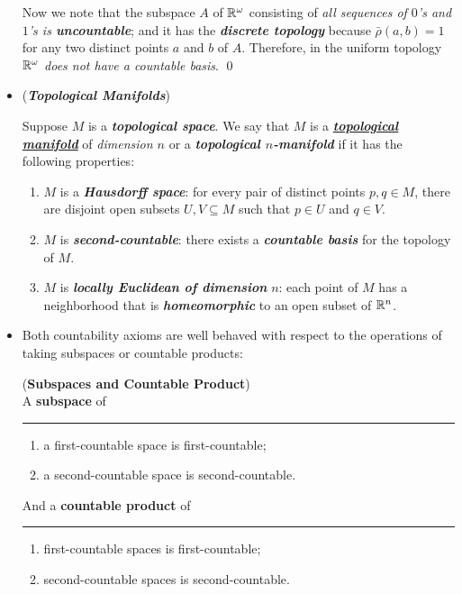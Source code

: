 \documentclass[11pt]{article}
\begin{document}
\begin{itemize}
\begin{example}
Now we note that the subspace $A$ of ${\mathbb R}^{\omega}$ consisting of \emph{all sequences of $0$'s and $1$'s is \textbf{uncountable}}; and it has the \emph{\textbf{discrete topology}} because $\bar{\rho}(a, b) = 1$ for any two distinct points $a$ and $b$ of $A$. Therefore, in the uniform topology ${\mathbb R}^{\omega}$ \emph{does not have a countable basis}. \qed
\end{example}

\item \begin{example} (\emph{\textbf{Topological Manifolds}})
 \begin{definition}
Suppose $M$ is a \emph{\textbf{topological space}}. We say that $M$ is a \underline{\emph{\textbf{topological manifold}}} of \emph{dimension $n$} or a \emph{\textbf{topological $n$-manifold}} if it has the following properties:
\begin{enumerate}
\item $M$ is a \emph{\textbf{Hausdorff space}}: for every pair of distinct points $p, q \in M$, there are disjoint open subsets $U, V \subseteq M$ such that $p \in U$ and $q \in V$.
\item $M$ is \emph{\textbf{second-countable}}: there exists a \emph{\textbf{countable basis}} for the topology of $M$.
\item $M$ is \emph{\textbf{locally Euclidean of dimension}} $n$: each point of $M$ has a neighborhood that is \emph{\textbf{homeomorphic}} to an open subset of ${\mathbb R}^n$. 
\end{enumerate}
\end{definition}
\end{example}

\item Both countability axioms are well behaved with respect to the operations of taking subspaces or countable products:
\begin{proposition}(\textbf{Subspaces and Countable Product}) \citep{munkres2000topology}\\
A \textbf{subspace} of \rule{1cm}{0.0001mm}
\begin{enumerate}
\item a first-countable space is first-countable;
\item a second-countable space is second-countable.
\end{enumerate}
And a \textbf{countable product} of \rule{1cm}{0.0001mm}
\begin{enumerate}
\item first-countable spaces is first-countable;
\item second-countable spaces is second-countable.
\end{enumerate}
\end{proposition}


\end{itemize}
\end{document}
